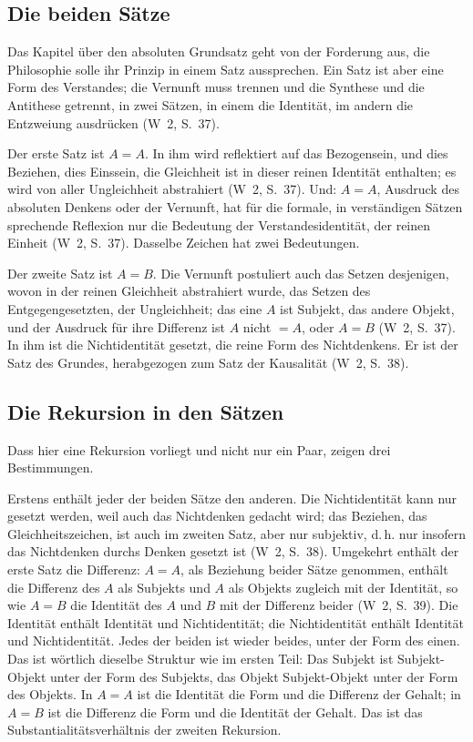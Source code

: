 \documentclass[11pt,a4paper]{article}
\newcommand{\SO}{Subjekt-Objekt}
\newcommand{\Werke}[1]{(W~2, S.~#1)}
\begin{document}
\subsection{Die beiden Sätze}

Das Kapitel über den absoluten Grundsatz geht von der Forderung aus, die Philosophie solle ihr Prinzip in einem Satz aussprechen. Ein Satz ist aber eine Form des Verstandes; die Vernunft muss trennen und \glqq die Synthese und die Antithese getrennt, in zwei Sätzen, in einem die Identität, im andern die Entzweiung ausdrücken\grqq{} \Werke{37}.

Der erste Satz ist $A = A$. In ihm \glqq wird reflektiert auf das Bezogensein, und dies Beziehen, dies Einssein, die Gleichheit ist in dieser reinen Identität enthalten; es wird von aller Ungleichheit abstrahiert\grqq{} \Werke{37}. Und: $A = A$, \glqq Ausdruck des absoluten Denkens oder der Vernunft\grqq{}, hat \glqq für die formale, in verständigen Sätzen sprechende Reflexion nur die Bedeutung der Verstandesidentität, der reinen Einheit\grqq{} \Werke{37}. Dasselbe Zeichen hat zwei Bedeutungen.

Der zweite Satz ist $A = B$. Die Vernunft postuliert \glqq auch das Setzen desjenigen, wovon in der reinen Gleichheit abstrahiert wurde, das Setzen des Entgegengesetzten, der Ungleichheit; das eine $A$ ist Subjekt, das andere Objekt, und der Ausdruck für ihre Differenz ist $A$ nicht $= A$, oder $A = B$\grqq{} \Werke{37}. In ihm ist die Nichtidentität gesetzt, \glqq die reine Form des Nichtdenkens\grqq{}. Er ist der Satz des Grundes, herabgezogen zum Satz der Kausalität \Werke{38}.

\subsection{Die Rekursion in den Sätzen}

Dass hier eine Rekursion vorliegt und nicht nur ein Paar, zeigen drei Bestimmungen.

Erstens enthält jeder der beiden Sätze den anderen. Die Nichtidentität kann nur gesetzt werden, weil auch das Nichtdenken gedacht wird; das Beziehen, das Gleichheitszeichen, ist auch im zweiten Satz, \glqq aber nur subjektiv, d.\,h. nur insofern das Nichtdenken durchs Denken gesetzt ist\grqq{} \Werke{38}. Umgekehrt enthält der erste Satz die Differenz: $A = A$, als Beziehung beider Sätze genommen, \glqq enthält die Differenz des $A$ als Subjekts und $A$ als Objekts zugleich mit der Identität, so wie $A = B$ die Identität des $A$ und $B$ mit der Differenz beider\grqq{} \Werke{39}. Die Identität enthält Identität und Nichtidentität; die Nichtidentität enthält Identität und Nichtidentität. Jedes der beiden ist wieder beides, unter der Form des einen. Das ist wörtlich dieselbe Struktur wie im ersten Teil: Das Subjekt ist \SO{} unter der Form des Subjekts, das Objekt \SO{} unter der Form des Objekts. In $A = A$ ist die Identität die Form und die Differenz der Gehalt; in $A = B$ ist die Differenz die Form und die Identität der Gehalt. Das ist das Substantialitätsverhältnis der zweiten Rekursion.
\end{document}
